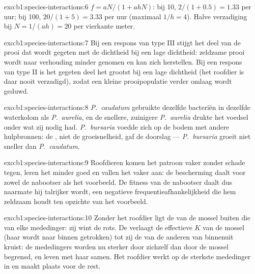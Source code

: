 \begin{solution}{exo:b1:species-interactions:6}
$f = aN/(1 + ahN)$: bij 10, $2/(1 + 0.5) = 1.33$ per uur; bij 100,
$20/(1 + 5) = 3.33$ per uur (maximaal $1/h = 4$). Halve verzadiging bij
$N = 1/(ah) = 20$ per vierkante meter.
\end{solution}

\begin{solution}{exo:b1:species-interactions:7}
Bij een respons van type III stijgt het deel van de prooi dat wordt gegeten
met de dichtheid bij een lage dichtheid: zeldzame prooi wordt naar
verhouding minder genomen en kan zich herstellen. Bij een respons van type
II is het gegeten deel het grootst bij een lage dichtheid (het roofdier is
daar nooit verzadigd), zodat een kleine prooipopulatie verder omlaag wordt
geduwd.
\end{solution}

\begin{solution}{exo:b1:species-interactions:8}
\emph{P.~caudatum} gebruikte dezelfde bacteriën in dezelfde waterkolom
als \emph{P.~aurelia}, en de snellere, zuinigere \emph{P.~aurelia}
drukte het voedsel onder wat zij nodig had. \emph{P.~bursaria} voedde zich
op de bodem met andere hulpbronnen: de , niet de groeisnelheid, gaf de
doorslag --- \emph{P.~bursaria} groeit niet sneller dan \emph{P.~caudatum}.
\end{solution}

\begin{solution}{exo:b1:species-interactions:9}
Roofdieren komen het patroon vaker zonder schade tegen, leren het minder
goed en vallen het vaker aan: de bescherming daalt voor zowel de nabootser
als het voorbeeld. De fitness van de nabootser daalt dus naarmate hij
talrijker wordt, een negatieve frequentieafhankelijkheid die hem zeldzaam
houdt ten opzichte van het voorbeeld.
\end{solution}

\begin{solution}{exo:b1:species-interactions:10}
Zonder het roofdier ligt de  van de mossel buiten die van elke
mededinger: zij wint de rots. De  verlaagt de effectieve $K$ van de
mossel (haar  wordt naar binnen getrokken) tot zij de  van
de anderen van binnenuit kruist: de mededingers worden nu sterker door
zichzelf dan door de mossel begrensd, en leven met haar samen. Het roofdier
werkt op de sterkste mededinger in en maakt plaats voor de rest.
\end{solution}

